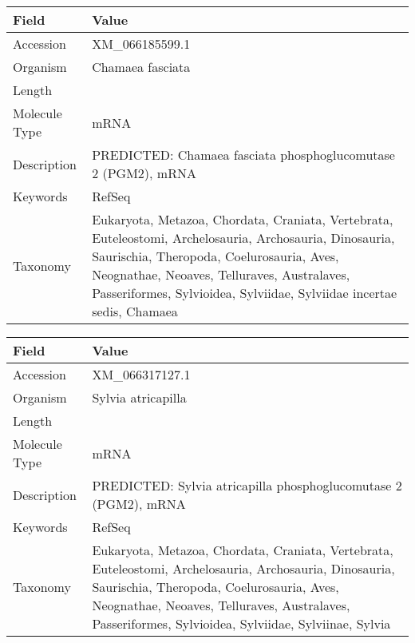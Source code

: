 \documentclass[10pt]{article}
\begin{document}
\vspace{1em}
{\footnotesize
\begin{longtable}{>{\raggedright\arraybackslash}p{4.5cm} >{\raggedright\arraybackslash}p{11.5cm}}
\textbf{Field} & \textbf{Value} \\
\hline
Accession & XM\_066185599.1 \\
Organism & Chamaea fasciata \\
Length & 2184 \\
Molecule Type & mRNA \\
Description & PREDICTED: Chamaea fasciata phosphoglucomutase 2 (PGM2), mRNA \\
Keywords & RefSeq \\
Taxonomy & Eukaryota, Metazoa, Chordata, Craniata, Vertebrata, Euteleostomi, Archelosauria, Archosauria, Dinosauria, Saurischia, Theropoda, Coelurosauria, Aves, Neognathae, Neoaves, Telluraves, Australaves, Passeriformes, Sylvioidea, Sylviidae, Sylviidae incertae sedis, Chamaea \\
\end{longtable}
}

\vspace{1em}
{\footnotesize
\begin{longtable}{>{\raggedright\arraybackslash}p{4.5cm} >{\raggedright\arraybackslash}p{11.5cm}}
\textbf{Field} & \textbf{Value} \\
\hline
Accession & XM\_066317127.1 \\
Organism & Sylvia atricapilla \\
Length & 2156 \\
Molecule Type & mRNA \\
Description & PREDICTED: Sylvia atricapilla phosphoglucomutase 2 (PGM2), mRNA \\
Keywords & RefSeq \\
Taxonomy & Eukaryota, Metazoa, Chordata, Craniata, Vertebrata, Euteleostomi, Archelosauria, Archosauria, Dinosauria, Saurischia, Theropoda, Coelurosauria, Aves, Neognathae, Neoaves, Telluraves, Australaves, Passeriformes, Sylvioidea, Sylviidae, Sylviinae, Sylvia \\
\end{longtable}
}
\end{document}
